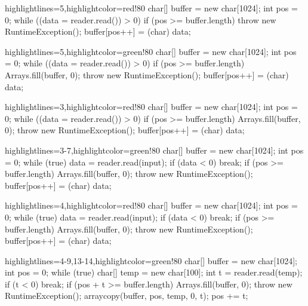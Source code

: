 \documentclass{article}
\begin{document}
\newpage
{}
\begin{snippet}
\begin{ffcode*}{highlightlines={5},highlightcolor=red!80}
char[] buffer = new char[1024];
int pos = 0;
while ((data = reader.read()) > 0) {
  if (pos >= buffer.length) {
    throw new RuntimeException();
  }
  buffer[pos++] = (char) data;
}
\end{ffcode*}
\columnbreak
\begin{ffcode*}{highlightlines={5},highlightcolor=green!80}
char[] buffer = new char[1024];
int pos = 0;
while ((data = reader.read()) > 0) {
  if (pos >= buffer.length) {
    Arrays.fill(buffer, 0);
    throw new RuntimeException();
  }
  buffer[pos++] = (char) data;
}
\end{ffcode*}
\end{snippet}

\newpage
{}
\begin{snippet}
\begin{ffcode*}{highlightlines={3},highlightcolor=red!80}
char[] buffer = new char[1024];
int pos = 0;
while ((data = reader.read()) > 0) {
  if (pos >= buffer.length) {
    Arrays.fill(buffer, 0);
    throw new RuntimeException();
  }
  buffer[pos++] = (char) data;
}
\end{ffcode*}
\columnbreak
\begin{ffcode*}{highlightlines={3-7},highlightcolor=green!80}
char[] buffer = new char[1024];
int pos = 0;
while (true) {
  data = reader.read(input);
  if (data < 0) {
    break;
  }
  if (pos >= buffer.length) {
    Arrays.fill(buffer, 0);
    throw new RuntimeException();
  }
  buffer[pos++] = (char) data;
}
\end{ffcode*}
\end{snippet}

\newpage
{}
\begin{snippet}
\begin{ffcode*}{highlightlines={4},highlightcolor=red!80}
char[] buffer = new char[1024];
int pos = 0;
while (true) {
  data = reader.read(input);
  if (data < 0) {
    break;
  }
  if (pos >= buffer.length) {
    Arrays.fill(buffer, 0);
    throw new RuntimeException();
  }
  buffer[pos++] = (char) data;
}
\end{ffcode*}
\columnbreak
\begin{ffcode*}{highlightlines={4-9,13-14},highlightcolor=green!80}
char[] buffer = new char[1024];
int pos = 0;
while (true) {
  char[] temp = new char[100];
  int t = reader.read(temp);
  if (t < 0) {
    break;
  }
  if (pos + t >= buffer.length) {
    Arrays.fill(buffer, 0);
    throw new RuntimeException();
  }
  arraycopy(buffer, pos, temp, 0, t);
  pos += t;
}
\end{ffcode*}
\end{snippet}
\end{document}
